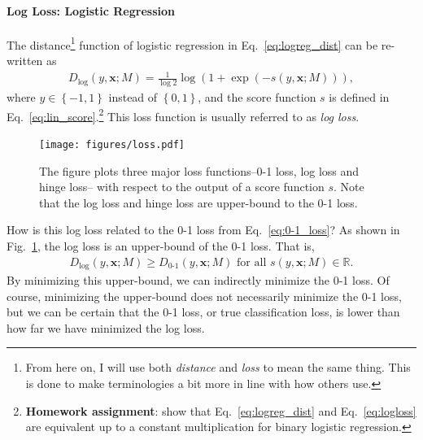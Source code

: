 \documentclass{report}
\newcommand{\vect}[1]{\mathbf{#1}}
\newcommand{\vx}[0]{\vect{x}}
\begin{document}
\paragraph{Log Loss: Logistic Regression}

The distance\footnote{
    From here on, I will use both {\it distance} and {\it loss} to mean the same
    thing. This is done to make terminologies a bit more in line with how
    others use.
}
function of logistic regression in Eq.~\eqref{eq:logreg_dist} can be re-written
as
\begin{align}
    \label{eq:logloss}
    D_{\log}(y, \vx; M) = \frac{1}{\log 2} \log(1+\exp(-s(y, \vx; M))),
\end{align}
where $y \in \left\{ -1, 1\right\}$ instead of $\left\{ 0, 1 \right\}$, and the
score function $s$ is defined in Eq.~\eqref{eq:lin_score}.\footnote{
    {\bf Homework assignment}: show that Eq.~\eqref{eq:logreg_dist} and
    Eq.~\eqref{eq:logloss} are equivalent up to a constant multiplication for
    binary logistic regression.
} This loss function is usually referred to as {\it log loss}.

\begin{figure}[t]
    \centering
    \begin{minipage}{0.6\textwidth}
        \raggedright
        \texttt{[image: figures/loss.pdf]}
    \end{minipage}
    \begin{minipage}{0.39\textwidth}
        \raggedleft
        \caption{
            \label{fig:loss}
            The figure plots three major loss functions--0-1 loss, log loss and
            hinge loss-- with respect to the output of a score function $s$.
            Note that the log loss and hinge loss are upper-bound to the 0-1
            loss.
        }
    \end{minipage}
\end{figure}

How is this log loss related to the 0-1 loss from Eq.~\eqref{eq:0-1_loss}? As
shown in Fig.~\ref{fig:loss}, the log loss is an upper-bound of the 0-1 loss.
That is,
\begin{align*}
    D_{\log}(y, \vx; M) \geq D_{\text{0-1}}(y, \vx; M)\text{ for all }s(y, \vx;
    M) \in \mathbb{R}.
\end{align*}
By minimizing this upper-bound, we can indirectly minimize the 0-1 loss. Of
course, minimizing the upper-bound does not necessarily minimize the 0-1 loss,
but we can be certain that the 0-1 loss, or true classification loss, is lower
than how far we have minimized the log loss. 
\end{document}

